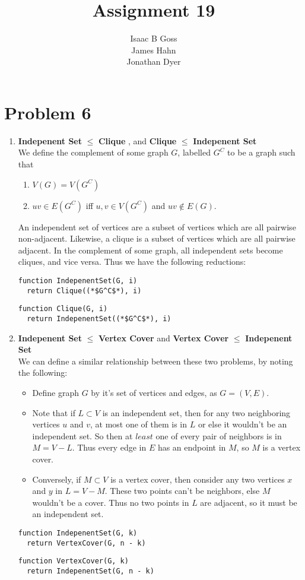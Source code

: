 \documentclass{article}
\author{Isaac B Goss\\ James Hahn\\ Jonathan Dyer}
\title{Assignment 19}
\providecommand{\prob}[1]{\section*{Problem #1}}
\providecommand{\reducible}[2]{
  \textbf{#1} $\leq$ \textbf{#2}
}
\begin{document}
\maketitle

\prob{6}

\begin{enumerate}
  \item \reducible{Indepenent Set}{Clique}, and \reducible{Clique}{Indepenent Set} \\
  We define the complement of some graph $G$, labelled $G^C$ to be a graph such that
  \begin{enumerate}
    \item $V(G) = V(G^C)$
    \item $uv \in E(G^C)$ iff $u,v \in V(G^C)$ and $uv \not\in E(G)$.
  \end{enumerate}
  An independent set of vertices are a subset of vertices which are all pairwise non-adjacent.
  Likewise, a clique is a subset of vertices which are all pairwise adjacent.
  In the complement of some graph, all independent sets become cliques, and vice versa.
  Thus we have the following reductions:
  \begin{lstlisting}
function IndepenentSet(G, i)
  return Clique((*$G^C$*), i)
  \end{lstlisting}
  \begin{lstlisting}
function Clique(G, i)
  return IndepenentSet((*$G^C$*), i)
  \end{lstlisting}
  \item \reducible{Indepenent Set}{Vertex Cover} and \reducible{Vertex Cover}{Indepenent Set} \\
  We can define a similar relationship between these two problems, by noting the following:
  \begin{itemize}
    \item Define graph $G$ by it's set of vertices and edges, as $G = (V,E)$.
    \item Note that if $L \subset V$ is an independent set, then for any two neighboring vertices $u$ and $v$, at most one of them is in $L$ or else it wouldn't be an independent set. So then at $least$ one of every pair of neighbors is in $M = V - L$. Thus every edge in $E$ has an endpoint in $M$, so $M$ is a vertex cover.
    \item Conversely, if $M \subset V$ is a vertex cover, then consider any two vertices $x$ and $y$ in $L = V - M$. These two points can't be neighbors, else $M$ wouldn't be a cover. Thus no two points in $L$ are adjacent, so it must be an independent set.
  \end{itemize}
  \begin{lstlisting}
function IndepenentSet(G, k)
  return VertexCover(G, n - k)
  \end{lstlisting}
  \begin{lstlisting}
function VertexCover(G, k)
  return IndepenentSet(G, n - k)
  \end{lstlisting}
\end{enumerate}
\end{document}
